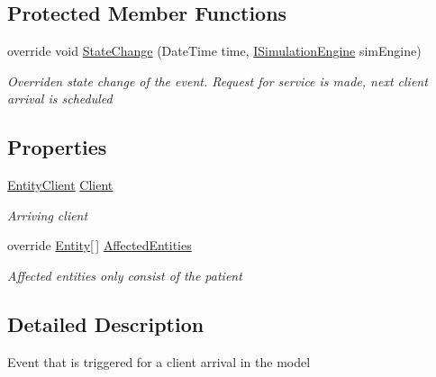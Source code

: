 \subsection*{Protected Member Functions}
\begin{DoxyCompactItemize}
\item 
override void \hyperlink{class_simple_queue_example_1_1_model_elements_1_1_event_client_arrival_ac46bd7ee64bea3ac3cf73e8af61063e2}{State\+Change} (Date\+Time time, \hyperlink{interface_simulation_core_1_1_simulation_classes_1_1_i_simulation_engine}{I\+Simulation\+Engine} sim\+Engine)
\begin{DoxyCompactList}\small\item\em Overriden state change of the event. Request for service is made, next client arrival is scheduled \end{DoxyCompactList}\end{DoxyCompactItemize}
\subsection*{Properties}
\begin{DoxyCompactItemize}
\item 
\hyperlink{class_simple_queue_example_1_1_model_elements_1_1_entity_client}{Entity\+Client} \hyperlink{class_simple_queue_example_1_1_model_elements_1_1_event_client_arrival_abbd0e3efc306016cdd41e581e57f7fcd}{Client}
\begin{DoxyCompactList}\small\item\em Arriving client \end{DoxyCompactList}\item 
override \hyperlink{class_simulation_core_1_1_h_c_c_m_elements_1_1_entity}{Entity}\mbox{[}$\,$\mbox{]} \hyperlink{class_simple_queue_example_1_1_model_elements_1_1_event_client_arrival_a231c01aa3f3e5b894259d954af2bbd6c}{Affected\+Entities}
\begin{DoxyCompactList}\small\item\em Affected entities only consist of the patient \end{DoxyCompactList}\end{DoxyCompactItemize}


\subsection{Detailed Description}
Event that is triggered for a client arrival in the model 



